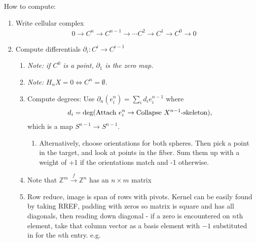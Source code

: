 How to compute:

\begin{enumerate}
\def\labelenumi{\arabic{enumi}.}
\item
  Write cellular complex
  \begin{align*}0 \to C^n \to C^{n-1} \to \cdots C^2 \to C^1 \to C^0 \to 0\end{align*}
\item
  Compute differentials \({\partial}_i: C^i \to C^{i-1}\)

  \begin{enumerate}
  \def\labelenumii{\arabic{enumii}.}
  \setcounter{enumii}{2}
  \tightlist
  \item
    \emph{Note: if \(C^0\) is a point, \({\partial}_1\) is the zero
    map.}
  \item
    \emph{Note: \(H_n X = 0 \iff C^n = \emptyset\).}
  \item
    Compute degrees: Use \({\partial}_n(e_i^n) = \sum_i d_i e_i^{n-1}\)
    where
    \begin{align*}d_i = \deg(\text{Attach }e_i^n \to \text{Collapse } X^{n-1}{\hbox{-}}\text{skeleton}),\end{align*}
    which is a map \(S^{n-1} \to S^{n-1}\).

    \begin{enumerate}
    \def\labelenumiii{\arabic{enumiii}.}
    \tightlist
    \item
      Alternatively, choose orientations for both spheres. Then pick a
      point in the target, and look at points in the fiber. Sum them up
      with a weight of +1 if the orientations match and -1 otherwise.
    \end{enumerate}
  \item
    Note that \({\mathbb{Z}}^m \xrightarrow{f} {\mathbb{Z}}^n\) has an
    \(n\times m\) matrix
  \item
    Row reduce, image is span of rows with pivots. Kernel can be easily
    found by taking RREF, padding with zeros so matrix is square and has
    all diagonals, then reading down diagonal - if a zero is encountered
    on \(n\)th element, take that column vector as a basis element with
    \(-1\) substituted in for the \(n\)th entry. e.g.
  \end{enumerate}


\end{enumerate}
